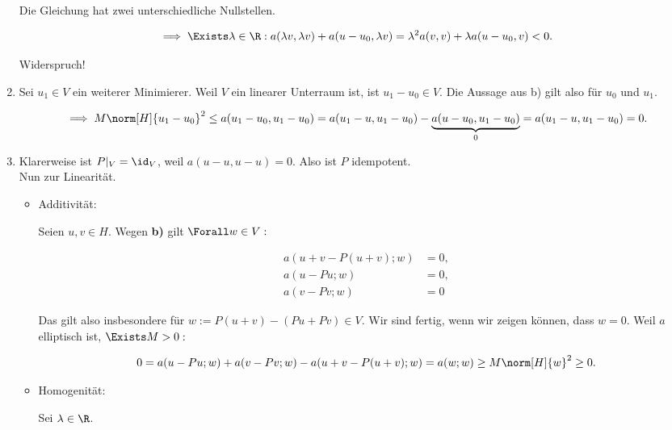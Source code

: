 \begin{solution}
\begin{enumerate}[label = \textbf{\alph*)}]
  Die Gleichung hat zwei unterschiedliche Nullstellen.

  \begin{align*}
    \implies
    \Exists \lambda \in \R:
    a(\lambda v, \lambda v) + a(u - u_0, \lambda v)
    =
    \lambda^2 a(v,v) + \lambda a(u - u_0, v) < 0.
  \end{align*}

  Widerspruch!

  \item Sei $u_1 \in V$ ein weiterer Minimierer.
  Weil $V$ ein linearer Unterraum ist, ist $u_1 - u_0 \in V$.
  Die Aussage aus b) gilt also für $u_0$ und $u_1$.

  \begin{align*}
    \implies
    M \norm[H]{u_1 - u_0}^2
    \leq
    a(u_1 - u_0, u_1 - u_0)
    =
    a(u_1 - u, u_1 - u_0)
    -
    \underbrace{a(u - u_0, u_1 - u_0)}_0
    =
    a(u_1 - u, u_1 - u_0) = 0.
  \end{align*}

  \item Klarerweise ist $P|_V = \id_V$, weil $a(u - u, u - u) = 0$.
  Also ist $P$ idempotent. \\
  Nun zur Linearität.

  \begin{itemize}

    \item Additivität:

    Seien $u, v \in H$.
    Wegen \textbf{b)} gilt $\Forall w \in V:$

      \begin{align*}
        a(u + v - P(u + v); w) & = 0, \\
        a(u - Pu; w) & = 0, \\
        a(v - Pv; w) & = 0
      \end{align*}

    Das gilt also insbesondere für $w := P(u + v) - (Pu + Pv) \in V$.
    Wir sind fertig, wenn wir zeigen können, dass $w = 0$.
    Weil $a$ elliptisch ist, $\Exists M > 0:$

    \begin{align*}
      0 =
      a(u - Pu; w)
      +
      a(v - Pv; w)
      -
      a(u + v - P(u + v); w)
      =
      a(w; w)
      \geq
      M \norm[H]{w}^2
      \geq 0.
    \end{align*}

    \item Homogenität:

    Sei $\lambda \in \R$.


\end{itemize}
\end{enumerate}
\end{solution}

